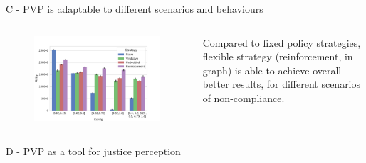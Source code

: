 \documentclass[xcolor={table}]{beamer}
\begin{document}
\begin{frame}[fragile=singleslide,t]
\begin{columns}[T]
\begin{column}{.47\textwidth}
\begin{block}{C - PVP is adaptable to different scenarios and behaviours}
\begin{columns}[c]
\begin{column}{.7\textwidth}
\begin{figure}
  \centering
  \includegraphics[width=1.1\linewidth]{img/exp2.pdf}%
  \label{respvar}
\end{figure}

\end{column}
\begin{column}{.3\textwidth}

Compared to fixed policy strategies, flexible strategy (reinforcement, in graph) is able to achieve overall better results, for different scenarios of non-compliance.

\end{column}
\end{columns}
\end{block}


\begin{block}{D - PVP as a tool for justice perception}

\begin{columns}[c]
\begin{column}{.7\textwidth}


\end{column}
\end{columns}
\end{block}
\end{column}
\end{columns}
\end{frame}
\end{document}
